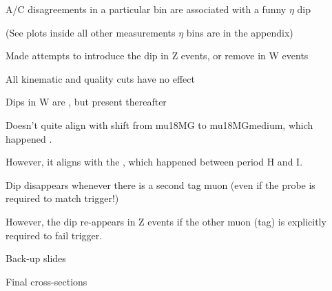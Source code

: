  {
 \iteb
 \item A/C disagreements in a particular bin are associated with a funny $\eta$ dip
 \item (See plots inside all other measurements $\eta$ bins are in the appendix)
 \item Made attempts to introduce the dip in Z events, or remove in W events
 \iteb
 \item All kinematic and quality cuts have no effect
 \item Dips in W are , but present thereafter
 \iteb
 \item Doesn't quite align with shift from mu18MG to mu18MGmedium, which happened .
 \item However, it aligns with the , which happened between period H and I.
 \itee
 \item Dip disappears whenever there is a second tag muon (even if the probe is required to match trigger!)
 \iteb
 \item However, the dip re-appears in Z events if the other muon (tag) is explicitly required to fail trigger.
 \itee
 \itee
 \itee
}


\appendix
{}
\setcounter{finalframe}{\value{framenumber}}

\slide{}
{

\centering
\Huge Back-up slides
}

\slide{}
{
\centering
\Huge Final cross-sections
}

